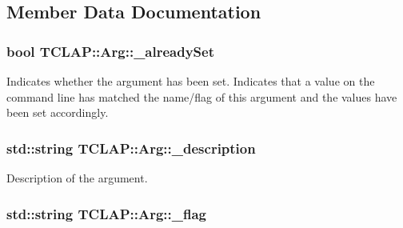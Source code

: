 \subsection{Member Data Documentation}
\hypertarget{class_t_c_l_a_p_1_1_arg_a829e32129857d2683e5791a5df1208ec}{
\subsubsection[{\+\_\+already\+Set}]{\setlength{\rightskip}{0pt plus 5cm}bool T\+C\+L\+A\+P\+::\+Arg\+::\+\_\+already\+Set\hspace{0.3cm}{\ttfamily [protected]}}}\label{class_t_c_l_a_p_1_1_arg_a829e32129857d2683e5791a5df1208ec}
Indicates whether the argument has been set. Indicates that a value on the command line has matched the name/flag of this argument and the values have been set accordingly. \hypertarget{class_t_c_l_a_p_1_1_arg_a9882fe256eaab01ac53db54ac657d272}{
\subsubsection[{\+\_\+description}]{\setlength{\rightskip}{0pt plus 5cm}std\+::string T\+C\+L\+A\+P\+::\+Arg\+::\+\_\+description\hspace{0.3cm}{\ttfamily [protected]}}}\label{class_t_c_l_a_p_1_1_arg_a9882fe256eaab01ac53db54ac657d272}
Description of the argument. \hypertarget{class_t_c_l_a_p_1_1_arg_ae68407a0a8223023ad0ae3b9dc7986f5}{
\subsubsection[{\+\_\+flag}]{\setlength{\rightskip}{0pt plus 5cm}std\+::string T\+C\+L\+A\+P\+::\+Arg\+::\+\_\+flag\hspace{0.3cm}{\ttfamily [protected]}}}\label{class_t_c_l_a_p_1_1_arg_ae68407a0a8223023ad0ae3b9dc7986f5}
